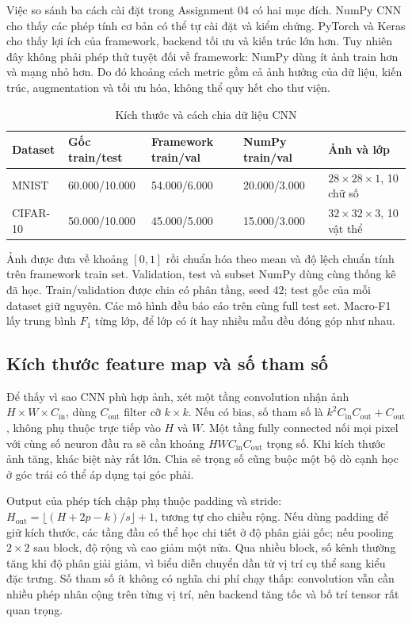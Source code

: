 \documentclass[12pt,a4paper]{report}
\begin{document}
Việc so sánh ba cách cài đặt trong Assignment 04 có hai mục đích. NumPy CNN cho thấy các phép tính cơ bản có thể tự cài đặt và kiểm chứng. PyTorch và Keras cho thấy lợi ích của framework, backend tối ưu và kiến trúc lớn hơn. Tuy nhiên đây không phải phép thử tuyệt đối về framework: NumPy dùng ít ảnh train hơn và mạng nhỏ hơn. Do đó khoảng cách metric gồm cả ảnh hưởng của dữ liệu, kiến trúc, augmentation và tối ưu hóa, không thể quy hết cho thư viện.

\begin{table}[htbp]\centering\caption{Kích thước và cách chia dữ liệu CNN}\label{tab:cnn-splits}
\footnotesize\begin{tabularx}{\textwidth}{p{1.7cm}p{2.2cm}p{2.3cm}p{2.3cm}X}
\toprule\textbf{Dataset} & \textbf{Gốc train/test} & \textbf{Framework train/val} & \textbf{NumPy train/val} & \textbf{Ảnh và lớp}\\\midrule
MNIST & 60.000/10.000 & 54.000/6.000 & 20.000/3.000 & $28\times28\times1$, 10 chữ số\\
CIFAR-10 & 50.000/10.000 & 45.000/5.000 & 15.000/3.000 & $32\times32\times3$, 10 vật thể\\
\bottomrule\end{tabularx}\end{table}

Ảnh được đưa về khoảng $[0,1]$ rồi chuẩn hóa theo mean và độ lệch chuẩn tính trên framework train set. Validation, test và subset NumPy dùng cùng thống kê đã học. Train/validation được chia có phân tầng, seed 42; test gốc của mỗi dataset giữ nguyên. Các mô hình đều báo cáo trên cùng full test set. Macro-F1 lấy trung bình $F_1$ từng lớp, để lớp có ít hay nhiều mẫu đều đóng góp như nhau.

\subsection{Kích thước feature map và số tham số}
Để thấy vì sao CNN phù hợp ảnh, xét một tầng convolution nhận ảnh $H\times W\times C_{\mathrm{in}}$, dùng $C_{\mathrm{out}}$ filter cỡ $k\times k$. Nếu có bias, số tham số là $k^2C_{\mathrm{in}}C_{\mathrm{out}}+C_{\mathrm{out}}$, không phụ thuộc trực tiếp vào $H$ và $W$. Một tầng fully connected nối mọi pixel với cùng số neuron đầu ra sẽ cần khoảng $HWC_{\mathrm{in}}C_{\mathrm{out}}$ trọng số. Khi kích thước ảnh tăng, khác biệt này rất lớn. Chia sẻ trọng số cũng buộc một bộ dò cạnh học ở góc trái có thể áp dụng tại góc phải.

Output của phép tích chập phụ thuộc padding và stride: $H_{\mathrm{out}}=\lfloor(H+2p-k)/s\rfloor+1$, tương tự cho chiều rộng. Nếu dùng padding để giữ kích thước, các tầng đầu có thể học chi tiết ở độ phân giải gốc; nếu pooling $2\times2$ sau block, độ rộng và cao giảm một nửa. Qua nhiều block, số kênh thường tăng khi độ phân giải giảm, vì biểu diễn chuyển dần từ vị trí cụ thể sang kiểu đặc trưng. Số tham số ít không có nghĩa chi phí chạy thấp: convolution vẫn cần nhiều phép nhân cộng trên từng vị trí, nên backend tăng tốc và bố trí tensor rất quan trọng.
\end{document}
